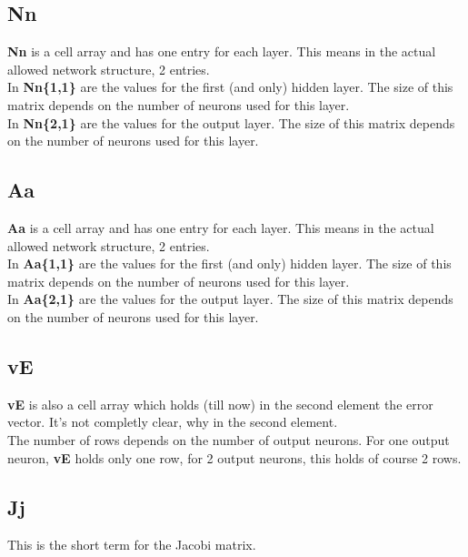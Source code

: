 \subsection{Nn}
\textbf{Nn} is a cell array and has one entry for each layer. This means in the actual allowed network
structure, 2 entries.\\
In \textbf{Nn\{1,1\}} are the values for the first (and only) hidden layer. The size of this matrix depends
on the number of neurons used for this layer.\\
In \textbf{Nn\{2,1\}} are the values for the output layer. The size of this matrix depends
on the number of neurons used for this layer.\\

\subsection{Aa}
\textbf{Aa} is a cell array and has one entry for each layer. This means in the actual allowed network
structure, 2 entries.\\
In \textbf{Aa\{1,1\}} are the values for the first (and only) hidden layer. The size of this matrix depends
on the number of neurons used for this layer.\\
In \textbf{Aa\{2,1\}} are the values for the output layer. The size of this matrix depends
on the number of neurons used for this layer.\\

\subsection{vE}
\textbf{vE} is also a cell array which holds (till now) in the second element the error vector. It's not completly clear, why in the second element.\\
The number of rows depends on the number of output neurons. For one output neuron, \textbf{vE} holds only one row, for 2 output neurons, this holds of course 2 rows. 

\subsection{Jj}
This is the short term for the Jacobi matrix.